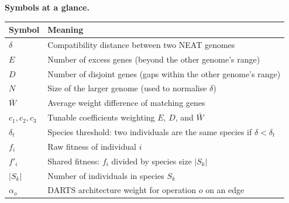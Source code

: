 \documentclass[a4paper,11pt]{article}
\begin{document}
\medskip
\noindent\textbf{Symbols at a glance.}
\begin{center}\small
\begin{tabular}{@{}ll@{}}
\toprule
\textbf{Symbol} & \textbf{Meaning} \\
\midrule
$\delta$        & Compatibility distance between two NEAT genomes \\
$E$             & Number of excess genes (beyond the other genome's range) \\
$D$             & Number of disjoint genes (gaps within the other genome's range) \\
$N$             & Size of the larger genome (used to normalise $\delta$) \\
$\bar{W}$       & Average weight difference of matching genes \\
$c_1,c_2,c_3$  & Tunable coefficients weighting $E$, $D$, and $\bar{W}$ \\
$\delta_t$      & Species threshold: two individuals are the same species if $\delta < \delta_t$ \\
$f_i$           & Raw fitness of individual $i$ \\
$f'_i$          & Shared fitness: $f_i$ divided by species size $|S_k|$ \\
$|S_k|$         & Number of individuals in species $S_k$ \\
$\alpha_o$      & DARTS architecture weight for operation $o$ on an edge \\
\bottomrule
\end{tabular}
\end{center}
\end{document}
